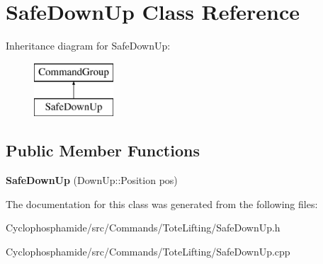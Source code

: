 \hypertarget{class_safe_down_up}{}\section{Safe\+Down\+Up Class Reference}
\label{class_safe_down_up}
Inheritance diagram for Safe\+Down\+Up\+:\begin{figure}[H]
\begin{center}
\leavevmode
\includegraphics[height=2.000000cm]{class_safe_down_up}
\end{center}
\end{figure}
\subsection*{Public Member Functions}
\begin{DoxyCompactItemize}
\item 
\hypertarget{class_safe_down_up_a950bd9713f2f5f726413041dc356c089}{}{\bfseries Safe\+Down\+Up} (Down\+Up\+::\+Position pos)\label{class_safe_down_up_a950bd9713f2f5f726413041dc356c089}

\end{DoxyCompactItemize}


The documentation for this class was generated from the following files\+:\begin{DoxyCompactItemize}
\item 
Cyclophosphamide/src/\+Commands/\+Tote\+Lifting/Safe\+Down\+Up.\+h\item 
Cyclophosphamide/src/\+Commands/\+Tote\+Lifting/Safe\+Down\+Up.\+cpp\end{DoxyCompactItemize}
